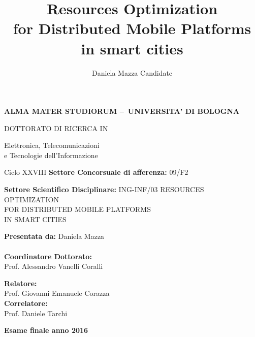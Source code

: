 \documentclass[twoside,openright]{report}
\begin{document}
\title{Resources Optimization \\for Distributed Mobile Platforms \\in smart cities}
\author{Daniela Mazza Candidate}

\hypersetup{pageanchor=false}
\begin{titlepage}
\begin{adjustwidth}{-4em}{-1cm}
\center
\vspace*{-2cm}
{\LARGE{\textsf{\textbf{ALMA MATER STUDIORUM  --\ UNIVERSITA' DI BOLOGNA}}}}

\vspace*{2cm}
{\LARGE{\textsf{DOTTORATO DI RICERCA IN}}}

\vspace{0.5cm}
\LARGE{\textsf{Elettronica, Telecomunicazioni \\ e Tecnologie dell'Informazione}}

\vspace{0.5cm}
{\LARGE{\textsf{Ciclo XXVIII}}}
\vspace{0.8cm}
\flushleft        
{\Large{\textsf{\textbf{Settore Concorsuale di afferenza:} 09/F2}}}  

\vspace{0.8cm}
{\Large{\textsf{\textbf{Settore Scientifico Disciplinare:} ING-INF/03}}}   
\vspace{0.8cm}
\center
\vspace{0.8cm}
{\LARGE{\textsf{RESOURCES OPTIMIZATION \\
FOR DISTRIBUTED MOBILE PLATFORMS \\ IN SMART CITIES}}}

\vspace{0.5cm}   
\flushleft


\begin{minipage}[t]{0.5\textwidth}
{\Large{\textsf{\textbf{Presentata da:} Daniela Mazza\\}}}  \\
{\Large{\textsf{\textbf{Coordinatore Dottorato:}}}}\\
{\Large{\textsf{Prof. Alessandro Vanelli Coralli}}}
\end{minipage}
\hfill
\hfill
\hfill\hfill\hfill\hfill\hfill\hfill
\begin{minipage}[t]{0.5\textwidth}
{\Large{\textsf{\textbf{Relatore:}}}}\\
{\Large{\textsf{Prof. Giovanni Emanuele Corazza}}}\\
{\Large{\textsf{\textbf{Correlatore:}}}}\\
{\Large{\textsf{Prof. Daniele Tarchi}}}
\end{minipage}

\vspace{1cm}
\center
{\Large{\textsf{\textbf{Esame finale anno 2016}}}}
\end{adjustwidth}
\end{titlepage}
\hypersetup{pageanchor=true}
\cleardoublepage
\end{document}

